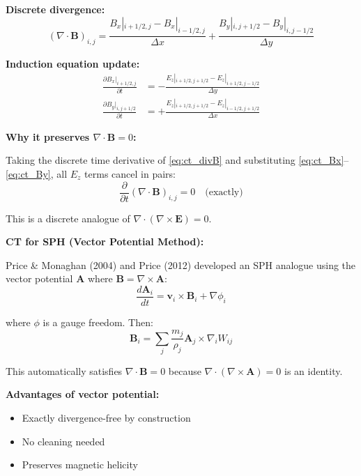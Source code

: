 \documentclass[12pt,a4paper]{article}
\begin{document}
\textbf{Discrete divergence:}
\begin{equation}
(\nabla \cdot \bm{B})_{i,j} = \frac{B_x|_{i+1/2,j} - B_x|_{i-1/2,j}}{\Delta x}
+ \frac{B_y|_{i,j+1/2} - B_y|_{i,j-1/2}}{\Delta y}
\label{eq:ct_divB}
\end{equation}

\textbf{Induction equation update:}
\begin{align}
\frac{\partial B_x|_{i+1/2,j}}{\partial t} &= -\frac{E_z|_{i+1/2,j+1/2} - E_z|_{i+1/2,j-1/2}}{\Delta y}
\label{eq:ct_Bx} \\
\frac{\partial B_y|_{i,j+1/2}}{\partial t} &= +\frac{E_z|_{i+1/2,j+1/2} - E_z|_{i-1/2,j+1/2}}{\Delta x}
\label{eq:ct_By}
\end{align}

\textbf{Why it preserves $\nabla \cdot \bm{B} = 0$:}

Taking the discrete time derivative of \eqref{eq:ct_divB} and substituting
\eqref{eq:ct_Bx}--\eqref{eq:ct_By}, all $E_z$ terms cancel in pairs:
\begin{equation}
\frac{\partial}{\partial t}(\nabla \cdot \bm{B})_{i,j} = 0 \quad \text{(exactly)}
\end{equation}

This is a discrete analogue of $\nabla \cdot (\nabla \times \bm{E}) = 0$.

\textbf{CT for SPH (Vector Potential Method):}

Price \& Monaghan (2004) and Price (2012) developed an SPH analogue using the
vector potential $\bm{A}$ where $\bm{B} = \nabla \times \bm{A}$:
\begin{equation}
\frac{d\bm{A}_i}{dt} = \bm{v}_i \times \bm{B}_i + \nabla\phi_i
\label{eq:vector_potential_sph}
\end{equation}

where $\phi$ is a gauge freedom. Then:
\begin{equation}
\bm{B}_i = \sum_j \frac{m_j}{\rho_j} \bm{A}_j \times \nabla_i W_{ij}
\label{eq:B_from_A}
\end{equation}

This automatically satisfies $\nabla \cdot \bm{B} = 0$ because
$\nabla \cdot (\nabla \times \bm{A}) = 0$ is an identity.

\textbf{Advantages of vector potential:}
\begin{itemize}
    \item Exactly divergence-free by construction
    \item No cleaning needed
    \item Preserves magnetic helicity
\end{itemize}
\end{document}
